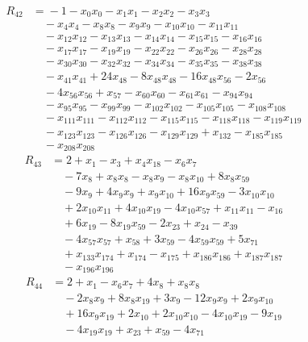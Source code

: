 \begin{align*}
R_{42}&={}-1 -x_{0}x_{0} -x_{1}x_{1} -x_{2}x_{2} -x_{3}x_{3}\\
&\quad{}-x_{4}x_{4} -x_{8}x_{8} -x_{9}x_{9} -x_{10}x_{10} -x_{11}x_{11}\\
&\quad{}-x_{12}x_{12} -x_{13}x_{13} -x_{14}x_{14} -x_{15}x_{15} -x_{16}x_{16}\\
&\quad{}-x_{17}x_{17} -x_{19}x_{19} -x_{22}x_{22} -x_{26}x_{26} -x_{28}x_{28}\\
&\quad{}-x_{30}x_{30} -x_{32}x_{32} -x_{34}x_{34} -x_{35}x_{35} -x_{38}x_{38}\\
&\quad{}-x_{41}x_{41} +24x_{48} -8x_{48}x_{48} -16x_{48}x_{56} -2x_{56}\\
&\quad{}-4x_{56}x_{56} +x_{57} -x_{60}x_{60} -x_{61}x_{61} -x_{94}x_{94}\\
&\quad{}-x_{95}x_{95} -x_{99}x_{99} -x_{102}x_{102} -x_{105}x_{105} -x_{108}x_{108}\\
&\quad{}-x_{111}x_{111} -x_{112}x_{112} -x_{115}x_{115} -x_{118}x_{118} -x_{119}x_{119}\\
&\quad{}-x_{123}x_{123} -x_{126}x_{126} -x_{129}x_{129} +x_{132} -x_{185}x_{185}\\
&\quad{}-x_{208}x_{208}
\end{align*}
\begin{align*}
R_{43}&={}2 +x_{1} -x_{3} +x_{4}x_{18} -x_{6}x_{7}\\
&\quad{}-7x_{8} +x_{8}x_{8} -x_{8}x_{9} -x_{8}x_{10} +8x_{8}x_{59}\\
&\quad{}-9x_{9} +4x_{9}x_{9} +x_{9}x_{10} +16x_{9}x_{59} -3x_{10}x_{10}\\
&\quad{}+2x_{10}x_{11} +4x_{10}x_{19} -4x_{10}x_{57} +x_{11}x_{11} -x_{16}\\
&\quad{}+6x_{19} -8x_{19}x_{59} -2x_{23} +x_{24} -x_{39}\\
&\quad{}-4x_{57}x_{57} +x_{58} +3x_{59} -4x_{59}x_{59} +5x_{71}\\
&\quad{}+x_{133}x_{174} +x_{174} -x_{175} +x_{186}x_{186} +x_{187}x_{187}\\
&\quad{}-x_{196}x_{196}
\end{align*}
\begin{align*}
R_{44}&={}2 +x_{1} -x_{6}x_{7} +4x_{8} +x_{8}x_{8}\\
&\quad{}-2x_{8}x_{9} +8x_{8}x_{19} +3x_{9} -12x_{9}x_{9} +2x_{9}x_{10}\\
&\quad{}+16x_{9}x_{19} +2x_{10} +2x_{10}x_{10} -4x_{10}x_{19} -9x_{19}\\
&\quad{}-4x_{19}x_{19} +x_{23} +x_{59} -4x_{71}
\end{align*}
